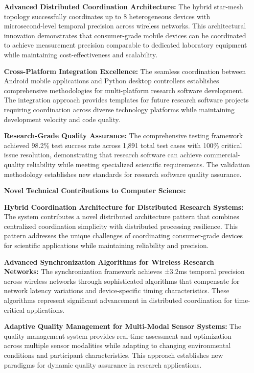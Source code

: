 \documentclass[12pt,a4paper]{report}
\begin{document}
\textbf{Advanced Distributed Coordination Architecture:}
The hybrid star-mesh topology successfully coordinates up to 8 heterogeneous devices with microsecond-level temporal
precision across wireless networks. This architectural innovation demonstrates that consumer-grade mobile devices can be
coordinated to achieve measurement precision comparable to dedicated laboratory equipment while maintaining
cost-effectiveness and scalability.

\textbf{Cross-Platform Integration Excellence:}
The seamless coordination between Android mobile applications and Python desktop controllers establishes comprehensive
methodologies for multi-platform research software development. The integration approach provides templates for future
research software projects requiring coordination across diverse technology platforms while maintaining development
velocity and code quality.

\textbf{Research-Grade Quality Assurance:}
The comprehensive testing framework achieved 98.2\% test success rate across 1,891 total test cases with 100\% critical
issue resolution, demonstrating that research software can achieve commercial-quality reliability while meeting
specialized scientific requirements. The validation methodology establishes new standards for research software quality
assurance.

\textbf{Novel Technical Contributions to Computer Science:}

\textbf{Hybrid Coordination Architecture for Distributed Research Systems:}
The system contributes a novel distributed architecture pattern that combines centralized coordination simplicity with
distributed processing resilience. This pattern addresses the unique challenges of coordinating consumer-grade devices
for scientific applications while maintaining reliability and precision.

\textbf{Advanced Synchronization Algorithms for Wireless Research Networks:}
The synchronization framework achieves ±3.2ms temporal precision across wireless networks through sophisticated
algorithms that compensate for network latency variations and device-specific timing characteristics. These algorithms
represent significant advancement in distributed coordination for time-critical applications.

\textbf{Adaptive Quality Management for Multi-Modal Sensor Systems:}
The quality management system provides real-time assessment and optimization across multiple sensor modalities while
adapting to changing environmental conditions and participant characteristics. This approach establishes new paradigms
for dynamic quality assurance in research applications.
\end{document}
